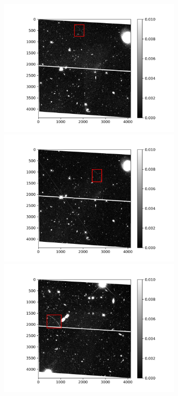 \documentclass[12pt,a4paper]{article}%
\begin{document}
\begin{figure}[H]
\begin{minipage}{0.48\textwidth}
    \end{minipage}
    \hspace{0cm}%
    \begin{minipage}{0.48\textwidth}
        \centering
        \includegraphics[width=0.83\textwidth]{fig167.jpg}
    \end{minipage}
    \begin{minipage}{0.48\textwidth}
        \centering
        \includegraphics[width=0.83\textwidth]{fig168.jpg}
    \end{minipage}
    \hspace{0cm}%
    \begin{minipage}{0.48\textwidth}
        \centering
        \includegraphics[width=0.83\textwidth]{fig223.jpg}

\end{minipage}
\end{figure}
\end{document}
